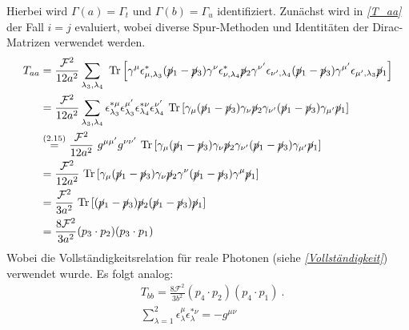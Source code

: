 Hierbei wird $\Gamma(a) = \Gamma_t$ und $ \Gamma(b) = \Gamma_u$ identifiziert. Zunächst wird in \textit{\autoref{T_aa}} der Fall $i = j$ evaluiert, wobei diverse Spur-Methoden und Identitäten der Dirac-Matrizen verwendet werden.
\begin{equation}
\begin{aligned}
T_{aa} &= \frac{\mathcal{F}^2}{12a^2} \sum_{\lambda_3, \lambda_4}~\text{Tr}\left[ \gamma^\mu \epsilon^*_{\mu,\lambda_3} (\cancel{p}_1- \cancel{p}_3)  \gamma^\nu \epsilon_{\nu, \lambda_4}^* \cancel{p}_2 \gamma^{\nu'} \epsilon_{\nu', \lambda_4} (\cancel{p}_1- \cancel{p}_3)  \gamma^{\mu'} \epsilon_{\mu', \lambda_3} \cancel{p}_1 \right] \\
&= \frac{\mathcal{F}^2}{12a^2} \sum_{\lambda_3, \lambda_4}\epsilon^{*\mu}_{\lambda_3}\epsilon^{\mu'} _{\lambda_3} \epsilon^{*\nu}_{\lambda_4}\epsilon^{\nu'}_{\lambda_4}~\text{Tr}\left[ \gamma_\mu (\cancel{p}_1- \cancel{p}_3)  \gamma_\nu \cancel{p}_2 \gamma_{\nu'} (\cancel{p}_1- \cancel{p}_3)  \gamma_{\mu'} \cancel{p}_1\right]\\
&\overset{\text{(2.15)}}{=}\frac{\mathcal{F}^2}{12a^2}~g^{\mu\mu'}g^{\nu\nu'}~\text{Tr}\left[ \gamma_\mu (\cancel{p}_1- \cancel{p}_3)  \gamma_\nu \cancel{p}_2 \gamma_{\nu'} (\cancel{p}_1- \cancel{p}_3)  \gamma_{\mu'} \cancel{p}_1\right] \\
&=\frac{\mathcal{F}^2}{12a^2}~\text{Tr}\left[ \gamma_\mu (\cancel{p}_1- \cancel{p}_3)  \gamma_\nu \cancel{p}_2 \gamma^{\nu} (\cancel{p}_1- \cancel{p}_3)  \gamma^{\mu} \cancel{p}_1\right]\\
&=\frac{\mathcal{F}^2}{3a^2}~\text{Tr}\left[(\cancel{p}_1- \cancel{p}_3) \cancel{p}_2 (\cancel{p}_1- \cancel{p}_3)\cancel{p}_1\right] \\
&=\frac{8\mathcal{F}^2}{3a^2}(p_3\cdot p_2)(p_3\cdot p_1)
\end{aligned}
\label{T_aa}
\end{equation}
Wobei die Vollständigkeitsrelation für reale Photonen (siehe \textit{\autoref{Vollständigkeit}}) verwendet wurde. Es folgt analog:
\begin{align}
&T_{bb} = \frac{8\mathcal{F}^2}{3b^2}(p_4\cdot p_2)(p_4\cdot p_1)~. \\
&\sum_{\lambda = 1}^{2} \epsilon^\mu_{\lambda} \epsilon^{*\nu}_{\lambda} = -g^{\mu \nu}
\label{Vollständigkeit}
\end{align}
